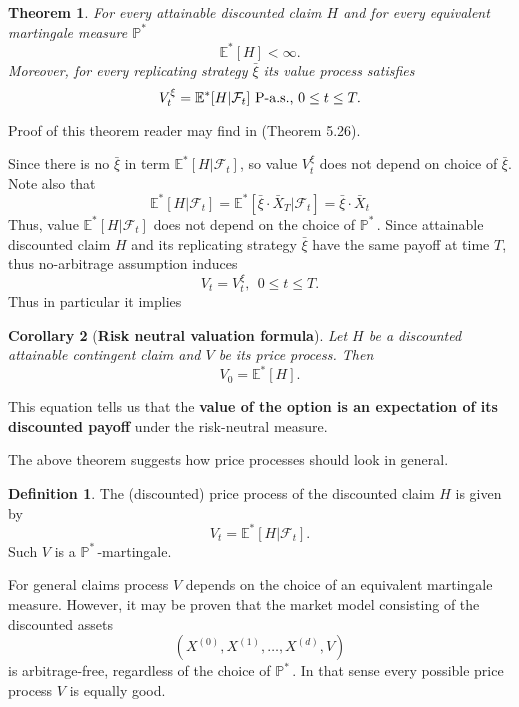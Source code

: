 \documentclass[a4paper,11pt, twoside]{book}
\newtheorem{thm}{Theorem}[chapter]
\newtheorem{coro}[thm]{Corollary}
\theoremstyle{definition}
\newtheorem{mydef}{Definition}[chapter]
\theoremstyle{remark}
\def\Em{{\mathbb{E}^*}}
\def\Pm{{\mathbb{P}}^*\,}
\def\Xa{\bar{X}}
\def\xia{\bar{\xi}}
\begin{document}
\begin{thm}
\label{thm:pricesProcess_mtg}
 For every attainable discounted claim $H$ and for every equivalent martingale measure $\Pm$
 \[ \Em [H] < \infty. \]
 Moreover, for every replicating strategy $\xia$ its value process satisfies
 \begin{equation}
  V^\xi_t = \Em[H | \mathcal{F}_t] \hbox{ P-a.s., } 0 \leq t \leq T .
 \end{equation}
\end{thm}
Proof of this theorem reader may find in \cite{follmer} (Theorem 5.26).

Since there is no $\xia$ in term $\Em[H | \mathcal{F}_t]$, so value $V^\xi_t$ does not depend on choice of $\xia$. Note also that
\begin{equation*}
 \Em[H | \mathcal{F}_t]  = \Em[\xia \cdot \Xa_T | \mathcal{F}_t]  = \xia \cdot \Xa_t
\end{equation*}
Thus, value $\Em[H | \mathcal{F}_t]$ does not depend on the choice of $\Pm$. 
Since attainable discounted claim $H$ and its replicating strategy $\xia$ have the same payoff at time $T$, thus no-arbitrage assumption induces
\[ V_t = V^\xi_t,\ \ 0 \leq t \leq T. \]
Thus in particular it implies
\begin{coro}[\textbf{Risk neutral valuation formula}]
\label{coro:price_mth}
Let $H$ be a discounted attainable contingent claim and $V$ be its price process. Then
\begin{equation}
 \label{eq:price_mtg}
 V_0 = \Em[H].
\end{equation}
\end{coro}
\noindent This equation tells us that the \textbf{value of the option is an expectation of its discounted payoff} under the risk-neutral measure.

The above theorem suggests how price processes should look in general.
\begin{mydef}
 The (discounted) price process of the discounted claim $H$ is given by
 \begin{equation*}
  V_t = \Em[H | \mathcal{F}_t].
 \end{equation*}
 Such $V$ is a $\Pm$-martingale.
\end{mydef}
For general claims process $V$ depends on the choice of an equivalent martingale measure. However, it may be proven that the market model consisting of the discounted assets
\[(X^{(0)}, X^{(1)},\ldots,X^{(d)}, V)\]
is arbitrage-free, regardless of the choice of $\Pm$. In that sense every possible price process $V$ is equally good.
\end{document}
